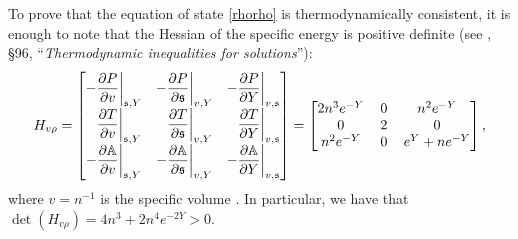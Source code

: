 \documentclass[aps,prl,noshowpacs,noshowkeys,floatfix,superscriptaddress,singlecolum,nofootinbib]{revtex4-2}
\theoremstyle{definition}
\theoremstyle{theorem}
\begin{document}
To prove that the equation of state \eqref{rhorho} is thermodynamically consistent, it is enough to note that the Hessian of the specific energy is positive definite (see \citet{landau5}, \S 96, ``\textit{Thermodynamic inequalities for solutions}''):
\begin{equation}
    H_{v\rho} = 
\begin{bmatrix}
-\dfrac{\partial P}{\partial v}\bigg|_{\mathfrak{s},Y} & -\dfrac{\partial P}{\partial \mathfrak{s}}\bigg|_{v,Y} & -\dfrac{\partial P}{\partial Y}\bigg|_{v,\mathfrak{s}} \\ 
\textcolor{white}{+}\dfrac{\partial T}{\partial v}\bigg|_{\mathfrak{s},Y} & \textcolor{white}{+}\dfrac{\partial T}{\partial \mathfrak{s}}\bigg|_{v,Y} & \textcolor{white}{+}\dfrac{\partial T}{\partial Y}\bigg|_{v,\mathfrak{s}} \\ 
-\dfrac{\partial \mathbb{A}}{\partial v}\bigg|_{\mathfrak{s},Y} & -\dfrac{\partial \mathbb{A}}{\partial \mathfrak{s}}\bigg|_{v,Y} & -\dfrac{\partial \mathbb{A}}{\partial Y}\bigg|_{v,\mathfrak{s}} \\ 
\end{bmatrix} =
\begin{bmatrix}
2n^3 e^{-Y} & 0 & n^2 e^{-Y} \\ 
0 & \, 2 \, & 0 \\ 
n^2 e^{-Y} & 0 & e^Y +ne^{-Y} \\ 
\end{bmatrix} ,
\end{equation}
where $v=n^{-1}$ is the specific volume \cite{ChoquetBruhatGRBook}. In particular, we have that $\det (H_{v\rho}) = 4n^3+2n^4 e^{-2Y}>0$.
\end{document}
